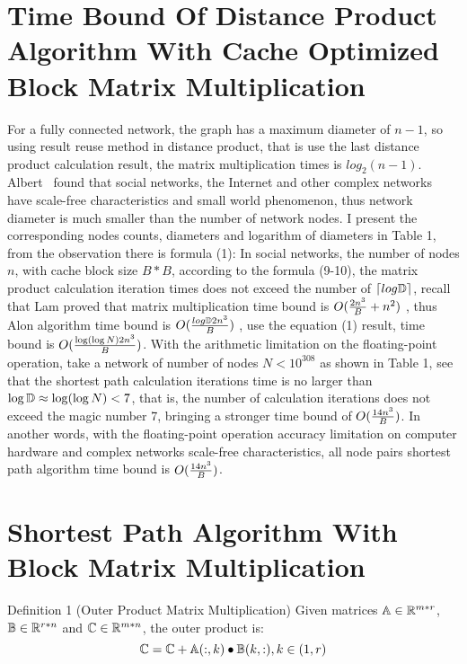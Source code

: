 \documentclass[review]{cvpr}
\begin{document}

\section{Time Bound Of Distance Product Algorithm With Cache Optimized Block Matrix Multiplication}
For a fully connected network, the graph has a maximum diameter of $n-1$, so using result reuse method in distance product, that is use the last distance product calculation result, the matrix multiplication times is $log_2(n-1)$.
Albert~\cite{albert1999diameter} found that social networks, the Internet and other complex networks have scale-free characteristics and small world phenomenon, thus network diameter is much smaller than the number of network nodes.
I present the corresponding nodes counts, diameters and logarithm of diameters in Table 1, from the observation there is formula (1):
In social networks, the number of nodes $n$, with cache block size $B*B$, according to the formula (9-10), the matrix product calculation iteration times does not exceed the number of $\lceil{log\Bbb D}\rceil$, recall that Lam \etal proved that matrix multiplication time bound is \(O({2n^3 \over B}+{n^2})\) ,
thus Alon \etal algorithm time bound is \(O({log\Bbb D2n^3\over B})\) , use the equation (1) result, time bound is \(O({ \log(\log{N})2n^3\over B})\).
With the arithmetic limitation on the floating-point operation, \eg take a network of number of nodes $N<10^{308}$
as shown in Table 1, see that the shortest path calculation iterations time is no larger than $\log{\Bbb D}\approx{\log(\log{N})}<7$, that is, the number of calculation iterations does not exceed the magic number 7,
bringing a stronger time bound of \(O({14n^3\over B})\).
In another words, with the floating-point operation accuracy limitation on computer hardware and complex networks scale-free characteristics, all node pairs shortest path algorithm time bound is \(O({14n^3\over B})\).




\section{Shortest Path Algorithm With Block Matrix Multiplication}

Definition 1 (Outer Product Matrix Multiplication) Given matrices \(\Bbb A \in \Bbb R^{m*r}\), \(\Bbb B \in \Bbb R^{r*n}\) and \(\Bbb C \in \Bbb R^{m*n}\), the outer product is:
\begin{equation}
\Bbb C = \Bbb C  + \Bbb A(:,k)\bullet \Bbb B(k,:) , k \in (1,r)
\end{equation}
\end{document}
